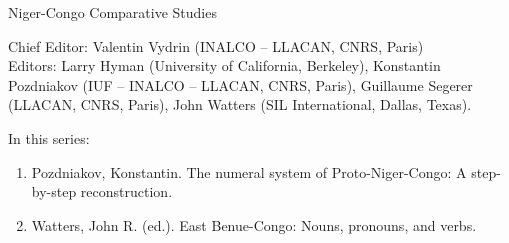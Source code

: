 {\large Niger-Congo Comparative Studies}

\bigskip

Chief Editor:  Valentin Vydrin (INALCO – LLACAN, CNRS, Paris) \\
Editors:      
    Larry Hyman (University of California, Berkeley),
    Konstantin Pozdniakov (IUF – INALCO – LLACAN, CNRS, Paris),
    Guillaume Segerer (LLACAN, CNRS, Paris),
    John Watters (SIL International, Dallas, Texas).


\bigskip

In this series:

\begin{enumerate}
\item Pozdniakov, Konstantin. The numeral system of Proto-Niger-Congo: A step-by-step reconstruction.
\item Watters, John R. (ed.). East Benue-Congo: Nouns, pronouns, and verbs.
\end{enumerate}

 
